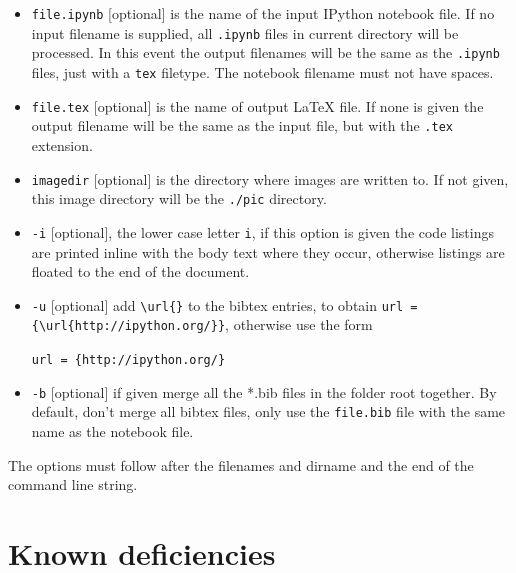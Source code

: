 \documentclass[english]{workpackage}[1996/06/02]
\begin{document}
\begin{itemize}
\item \verb+file.ipynb+  [optional]   is the name of the input IPython notebook file.   If no input filename is  supplied, all  \verb+.ipynb+ files in current directory will be processed.   In this event the output filenames will be the same as the \verb+.ipynb+ files, just with a \verb+tex+ filetype.  The notebook filename must not have spaces.
\item \verb+file.tex+ [optional]  is the name of output \LaTeX{} file. If none is given the output filename will be the same as the input file, but with the \verb+.tex+ extension.
\item \verb+imagedir+   [optional]   is the directory where images are written to.  If not given, this image directory will be the \verb+./pic+ directory.
\item \verb+-i+  [optional], the lower case letter \verb+i+, if this option is given the code     listings are printed inline with the body text where they occur,       otherwise listings are floated to the end of the document.
\item \verb+-u+ [optional] add \verb+\url{}+ to the bibtex entries, to obtain  \verb+url = {\url{http://ipython.org/}}+, otherwise use the form 


\verb+url = {http://ipython.org/}+
\item \verb+-b+ [optional] if given merge all the *.bib files in the folder root together. By default, don't merge all bibtex files, only use the \verb+file.bib+ file with the same name as the notebook file.
\end{itemize}

The options must follow after the filenames and dirname and the end of the command line string.




\section{Known deficiencies}
\label{sec:Knowndeficiencies}
\end{document}
